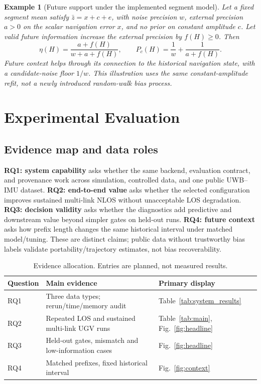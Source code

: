 \documentclass[conference]{IEEEtran}
\newtheorem{example}{Example}
\begin{document}
\begin{example}[Future support under the implemented segment model]
Let a fixed segment mean satisfy $\bar z=x+c+e$, with noise precision $w$, external precision $a>0$ on the scalar navigation error $x$, and no prior on constant amplitude $c$. Let valid future information increase the external precision by $f(H)\geq0$. Then
\begin{equation}
 \eta(H)=\frac{a+f(H)}{w+a+f(H)},\qquad
 P_c(H)=\frac1w+\frac1{a+f(H)}.
 \label{eq:scalar_future}
\end{equation}
Future context helps through its connection to the historical navigation state, with a candidate-noise floor $1/w$. This illustration uses the same constant-amplitude refit, not a newly introduced random-walk bias process.
\end{example}

\section{Experimental Evaluation}
\label{sec:experiments}
\subsection{Evidence map and data roles}
\textbf{RQ1: system capability} asks whether the same backend, evaluation contract, and provenance work across simulation, controlled data, and one public UWB--IMU dataset.
\textbf{RQ2: end-to-end value} asks whether the selected configuration improves sustained multi-link NLOS without unacceptable LOS degradation.
\textbf{RQ3: decision validity} asks whether the diagnostics add predictive and downstream value beyond simpler gates on held-out runs.
\textbf{RQ4: future context} asks how prefix length changes the same historical interval under matched model/tuning.
These are distinct claims; public data without trustworthy bias labels validate portability/trajectory estimates, not bias recoverability.

\begin{table}[t]
\centering\small
\caption{Evidence allocation. Entries are planned, not measured results.}
\label{tab:evidence}
\begin{tabularx}{\columnwidth}{@{}lXX@{}}
\toprule
Question & Main evidence & Primary display\\
\midrule
RQ1 & Three data types; rerun/time/memory audit & Table~\ref{tab:system_results}\\
RQ2 & Repeated LOS and sustained multi-link UGV runs & Table~\ref{tab:main}, Fig.~\ref{fig:headline}\\
RQ3 & Held-out gates, mismatch and low-information cases & Fig.~\ref{fig:headline}\\
RQ4 & Matched prefixes, fixed historical interval & Fig.~\ref{fig:context}\\
\bottomrule
\end{tabularx}
\end{table}
\end{document}
